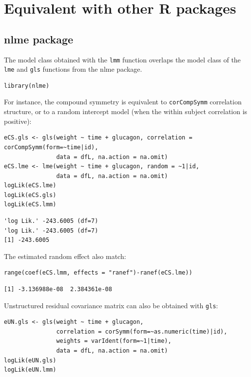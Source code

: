 \documentclass[12pt]{article}
\begin{document}
\clearpage

\section{Equivalent with other R packages}
\label{sec:org259eefc}

\subsection{nlme package}
\label{sec:orgbc42a95}

The model class obtained with the \texttt{lmm} function overlaps the model
class of the \texttt{lme} and \texttt{gls} functions from the nlme package.
\lstset{language=r,label= ,caption= ,captionpos=b,numbers=none}
\begin{lstlisting}
library(nlme)
\end{lstlisting}

For instance, the compound symmetry is equivalent to \texttt{corCompSymm}
correlation structure, or to a random intercept model (when the within
subject correlation is positive):
\lstset{language=r,label= ,caption= ,captionpos=b,numbers=none}
\begin{lstlisting}
eCS.gls <- gls(weight ~ time + glucagon, correlation = corCompSymm(form=~time|id),
               data = dfL, na.action = na.omit)
eCS.lme <- lme(weight ~ time + glucagon, random = ~1|id,
               data = dfL, na.action = na.omit)
logLik(eCS.lme)
logLik(eCS.gls)
logLik(eCS.lmm)
\end{lstlisting}

\begin{verbatim}
'log Lik.' -243.6005 (df=7)
'log Lik.' -243.6005 (df=7)
[1] -243.6005
\end{verbatim}


The estimated random effect also match:
\lstset{language=r,label= ,caption= ,captionpos=b,numbers=none}
\begin{lstlisting}
range(coef(eCS.lmm, effects = "ranef")-ranef(eCS.lme))
\end{lstlisting}

\begin{verbatim}
[1] -3.136988e-08  2.384361e-08
\end{verbatim}


Unstructured residual covariance matrix can also be obtained with
\texttt{gls}:
\lstset{language=r,label= ,caption= ,captionpos=b,numbers=none}
\begin{lstlisting}
eUN.gls <- gls(weight ~ time + glucagon,
               correlation = corSymm(form=~as.numeric(time)|id),
               weights = varIdent(form=~1|time),
               data = dfL, na.action = na.omit)
logLik(eUN.gls)
logLik(eUN.lmm)
\end{lstlisting}
\end{document}
